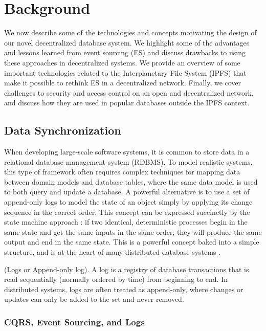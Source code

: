 \documentclass{textile}
\begin{document}
\section{Background}\label{sec:Background}

We now describe some of the technologies and concepts motivating the design of our novel decentralized database system. We highlight some of the advantages and lessons learned from event sourcing (ES) and discuss drawbacks to using these approaches in decentralized systems. We provide an overview of some important technologies related to the Interplanetary File System (IPFS) that make it possible to rethink ES in a decentralized network. Finally, we cover challenges to security and access control on an open and decentralized network, and discuss how they are used in popular databases outside the IPFS context.

\subsection{Data Synchronization}

When developing large-scale software systems, it is common to store data in a relational database management system (RDBMS). To model realistic systems, this type of framework often requires complex techniques for mapping data between domain models and database tables, where the same data model is used to both query and update a database. A powerful alternative is to use a set of append-only logs to model the state of an object simply by applying its change sequence in the correct order. This concept can be expressed succinctly by the state machine approach \cite{schneiderImplementingFaulttolerantServices1990}: if two identical, deterministic processes begin in the same state and get the same inputs in the same order, they will produce the same output and end in the same state. This is a powerful concept baked into a simple structure, and is at the heart of many distributed database systems \cite{jaykrepsLogWhatEvery2013}.

\begin{definition} (Logs or Append-only log). A log is a registry of database transactions that is read sequentially (normally ordered by time) from beginning to end. In distributed systems, logs are often treated as append-only, where changes or updates can only be added to the set and never removed.  \end{definition} \label{def:Logs}

\subsubsection{CQRS, Event Sourcing, and Logs}\label{sec:cqrs}
\end{document}
